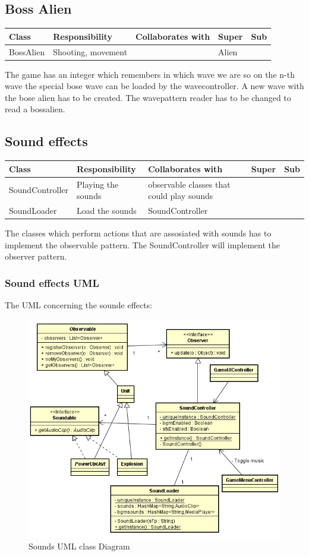 \subsection{ Boss Alien}
\begin{center}
    \begin{tabular}{ | p{4.5cm} | p{3cm} | p{3cm} | p{3cm} | p{1cm} |}
  \hline
    Class & Responsibility & Collaborates with & Super & Sub \\ \hline
   BossAlien & Shooting, movement  &  & Alien & \\ \hline

    \end{tabular}
\end{center}
The game has an integer which remembers in which wave we are so on the n-th wave the special bose wave can be loaded by the wavecontroller. 
A new wave with the bose alien has to be created. The wavepattern reader has to be changed to read a bossalien.

\subsection{ Sound effects}
\begin{center}
    \begin{tabular}{ | p{4.5cm} | p{3cm} | p{3cm} | p{3cm} | p{1cm} |}
  \hline
    Class & Responsibility & Collaborates with & Super & Sub \\ \hline
   SoundController & Playing the sounds  & observable classes that could play sounds  &  & \\ \hline
   SoundLoader & Load the sounds  & SoundController  &  & \\ \hline

    \end{tabular}
\end{center}

The classes which perform actions that are assosiated with sounds has to implement the observable pattern.
The SoundController will implement the observer pattern.
\newpage
\subsubsection{ Sound effects UML}
The UML concerning the sounde effects:
\begin{figure}[ht!]
\centering
\includegraphics[width=15cm]{sounds.jpg}
\caption{Sounds UML class Diagram}
\label{fig:1-2sounds}
\end{figure}
